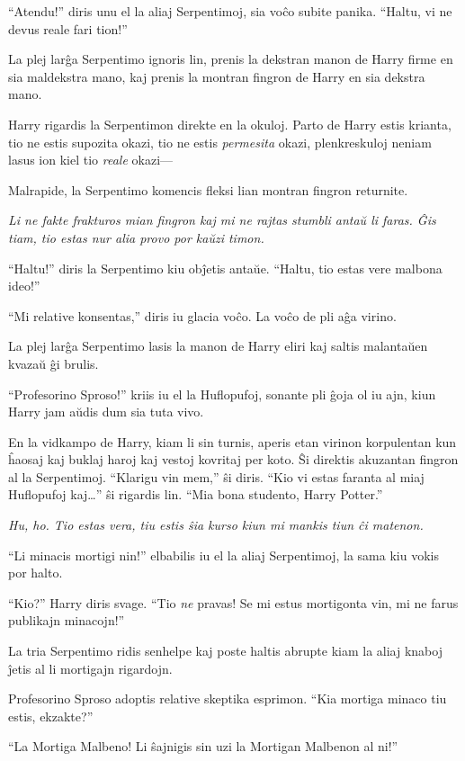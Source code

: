 ``Atendu!'' diris unu el la aliaj Serpentimoj, sia voĉo subite
panika. ``Haltu, vi ne devus reale fari tion!''

La plej larĝa Serpentimo ignoris lin, prenis la dekstran manon de Harry
firme en sia maldekstra mano, kaj prenis la montran fingron de Harry
en sia dekstra mano.

Harry rigardis la Serpentimon direkte en la okuloj. Parto de Harry
estis krianta, tio ne estis supozita okazi, tio ne estis \emph{permesita}
okazi, plenkreskuloj neniam lasus ion kiel tio \emph{reale} okazi—

Malrapide, la Serpentimo komencis fleksi lian montran fingron returnite.

\emph{Li ne fakte frakturos mian fingron kaj mi ne rajtas stumbli antaŭ
li faras. Ĝis tiam, tio estas nur alia provo por kaŭzi timon. }

``Haltu!'' diris la Serpentimo kiu obĵetis antaŭe. ``Haltu, tio estas
vere malbona ideo!''

``Mi relative konsentas,'' diris iu glacia voĉo. La voĉo de pli aĝa virino.

La plej larĝa Serpentimo lasis la manon de Harry eliri kaj saltis
malantaŭen kvazaŭ ĝi brulis.

``Profesorino Sproso!'' kriis iu el la Huflopufoj, sonante pli ĝoja
ol iu ajn, kiun Harry jam aŭdis dum sia tuta vivo.

En la vidkampo de Harry, kiam li sin turnis, aperis etan virinon korpulentan kun
ĥaosaj kaj buklaj haroj kaj vestoj kovritaj per koto. Ŝi direktis akuzantan
fingron al la Serpentimoj. ``Klarigu vin mem,'' ŝi diris. ``Kio vi estas faranta
al miaj Huflopufoj kaj\ldots'' ŝi rigardis lin. ``Mia bona studento, Harry
Potter.''

\emph{Hu, ho. Tio estas vera, tiu estis ŝia kurso kiun mi mankis tiun ĉi matenon.}

``Li minacis mortigi nin!'' elbabilis iu el la aliaj Serpentimoj, la
sama kiu vokis por halto.

``Kio?'' Harry diris svage. ``Tio \emph{ne} pravas! Se mi estus
mortigonta vin, mi ne farus publikajn minacojn!''

La tria Serpentimo ridis senhelpe kaj poste haltis abrupte kiam la
aliaj knaboj ĵetis al li mortigajn rigardojn.

Profesorino Sproso adoptis relative skeptika esprimon. ``Kia mortiga
minaco tiu estis, ekzakte?''

``La Mortiga Malbeno! Li ŝajnigis sin uzi la Mortigan Malbenon al
ni!''

